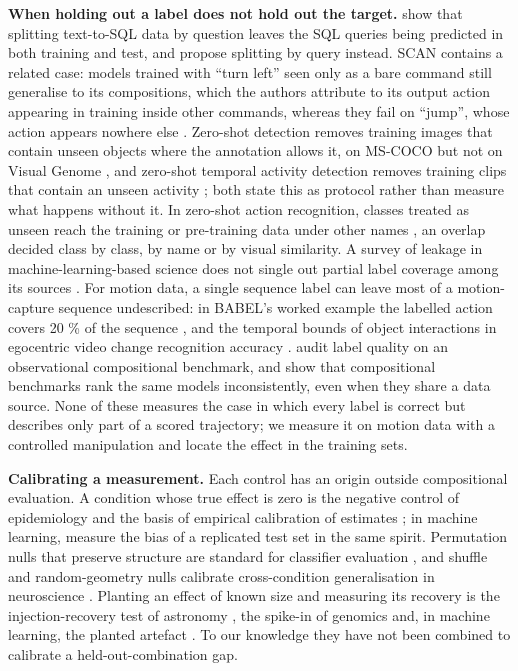 \documentclass[10pt]{article}
\begin{document}
\textbf{When holding out a label does not hold out the target.} \citet{finegan2018improving} show that splitting text-to-SQL data by question leaves the SQL queries being predicted in both training and test, and propose splitting by query instead. SCAN contains a related case: models trained with ``turn left'' seen only as a bare command still generalise to its compositions, which the authors attribute to its output action appearing in training inside other commands, whereas they fail on ``jump'', whose action appears nowhere else \citep{lake2018generalization}. Zero-shot detection removes training images that contain unseen objects where the annotation allows it, on MS-COCO but not on Visual Genome \citep{bansal2018zero}, and zero-shot temporal activity detection removes training clips that contain an unseen activity \citep{zhang2020zstad}; both state this as protocol rather than measure what happens without it. In zero-shot action recognition, classes treated as unseen reach the training or pre-training data under other names \citep{roitberg2018towards,brattoli2020rethinking,gowda2021new}, an overlap decided class by class, by name or by visual similarity. A survey of leakage in machine-learning-based science does not single out partial label coverage among its sources \citep{kapoor2023leakage}. For motion data, a single sequence label can leave most of a motion-capture sequence undescribed: in BABEL's worked example the labelled action covers 20 \% of the sequence \citep{punnakkal2021babel}, and the temporal bounds of object interactions in egocentric video change recognition accuracy \citep{moltisanti2017trespassing}. \citet{atzmon2020causal} audit label quality on an observational compositional benchmark, and \citet{sun2023validity} show that compositional benchmarks rank the same models inconsistently, even when they share a data source. None of these measures the case in which every label is correct but describes only part of a scored trajectory; we measure it on motion data with a controlled manipulation and locate the effect in the training sets.

\textbf{Calibrating a measurement.} Each control has an origin outside compositional evaluation. A condition whose true effect is zero is the negative control of epidemiology \citep{lipsitch2010negative} and the basis of empirical calibration of estimates \citep{schuemie2014interpreting,schuemie2018empirical}; in machine learning, \citet{engstrom2020identifying} measure the bias of a replicated test set in the same spirit. Permutation nulls that preserve structure are standard for classifier evaluation \citep{ojala2010permutation}, and shuffle and random-geometry nulls calibrate cross-condition generalisation in neuroscience \citep{bernardi2020geometry}. Planting an effect of known size and measuring its recovery is the injection-recovery test of astronomy \citep{petigura2013prevalence}, the spike-in of genomics \citep{jiang2011synthetic} and, in machine learning, the planted artefact \citep{adebayo2022post}. To our knowledge they have not been combined to calibrate a held-out-combination gap.
\end{document}
